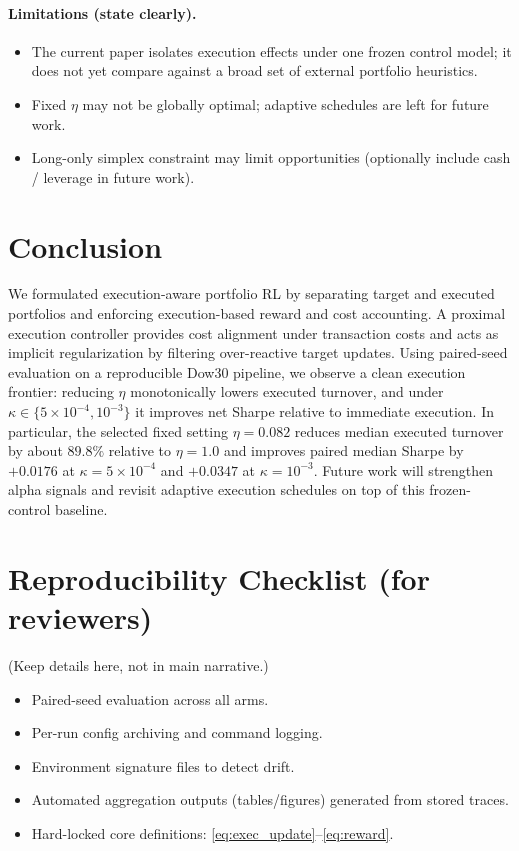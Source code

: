 \documentclass[10pt,twocolumn]{article}
\begin{document}
\paragraph{Limitations (state clearly).}
\begin{itemize}[leftmargin=*,itemsep=1pt]
\item The current paper isolates execution effects under one frozen control model; it does not yet compare against a broad set of external portfolio heuristics.
\item Fixed $\eta$ may not be globally optimal; adaptive schedules are left for future work.
\item Long-only simplex constraint may limit opportunities (optionally include cash / leverage in future work).
\end{itemize}

\section{Conclusion}
We formulated execution-aware portfolio RL by separating target and executed portfolios and enforcing execution-based reward and cost accounting. A proximal execution controller provides cost alignment under transaction costs and acts as implicit regularization by filtering over-reactive target updates. Using paired-seed evaluation on a reproducible Dow30 pipeline, we observe a clean execution frontier: reducing $\eta$ monotonically lowers executed turnover, and under $\kappa\in\{5\times10^{-4},10^{-3}\}$ it improves net Sharpe relative to immediate execution. In particular, the selected fixed setting $\eta=0.082$ reduces median executed turnover by about $89.8\%$ relative to $\eta=1.0$ and improves paired median Sharpe by $+0.0176$ at $\kappa=5\times10^{-4}$ and $+0.0347$ at $\kappa=10^{-3}$. Future work will strengthen alpha signals and revisit adaptive execution schedules on top of this frozen-control baseline.

\appendix
\section{Reproducibility Checklist (for reviewers)}
(Keep details here, not in main narrative.)
\begin{itemize}[leftmargin=*,itemsep=1pt]
\item Paired-seed evaluation across all arms.
\item Per-run config archiving and command logging.
\item Environment signature files to detect drift.
\item Automated aggregation outputs (tables/figures) generated from stored traces.
\item Hard-locked core definitions: \eqref{eq:exec_update}--\eqref{eq:reward}.
\end{itemize}
\end{document}
